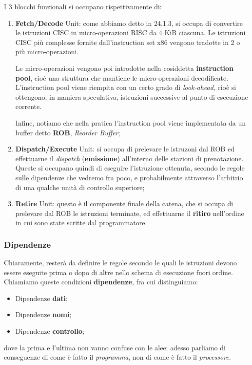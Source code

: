 \documentclass[a4paper,11pt]{article}
\begin{document}
I 3 blocchi funzionali si occupano rispettivamente di:
\begin{enumerate}
	\item \textbf{Fetch/Decode} Unit: come abbiamo detto in 24.1.3, si occupa di convertire le istruzioni CISC in micro-operazioni RISC da 4 KiB ciascuna.
		Le istruzioni CISC più complesse fornite dall'instruction set x86 vengono tradotte in 2 o più micro-operazioni.
		
		Le micro-operazioni vengono poi introdotte nella cosiddetta \textbf{instruction pool}, cioè una struttura che mantiene le micro-operazioni decodificate.
		L'instruction pool viene riempita con un certo grado di \textit{look-ahead}, cioè si ottengono, in maniera speculativa, istruzioni successive al punto di esecuzione corrente.

		Infine, notiamo che nella pratica l'instruction pool viene implementata da un buffer detto \textbf{ROB}, \textit{Reorder Buffer};

	\item \textbf{Dispatch/Execute} Unit: si occupa di prelevare le istruzoni dal ROB ed effettuarne il \textit{dispatch} (\textbf{emissione}) all'interno delle stazioni di prenotazione.
		Queste si occupano quindi di eseguire l'istruzione ottenuta, secondo le regole sulle dipendenze che vedremo fra poco, e probabilmente attraverso l'arbitrio di una qualche unità di controllo superiore;

	\item \textbf{Retire} Unit: questo è il componente finale della catena, che si occupa di prelevare dal ROB le istruzioni terminate, ed effettuarne il \textbf{ritiro} nell'ordine in cui sono state scritte dal programmatore.
\end{enumerate}

\subsubsection{Dipendenze}
Chiaramente, resterà da definire le regole secondo le quali le istruzioni devono essere eseguite prima o dopo di altre nello schema di esecuzione fuori ordine.
Chiamiamo queste condizioni \textbf{dipendenze}, fra cui distinguiamo:
\begin{itemize}
	\item Dipendenze \textbf{dati};
	\item Dipendenze \textbf{nomi};
	\item Dipendenze \textbf{controllo};
\end{itemize}
dove la prima e l'ultima non vanno confuse con le alee: adesso parliamo di conseguenze di come è fatto il \textit{programma}, non di come è fatto il \textit{processore}.
\end{document}
